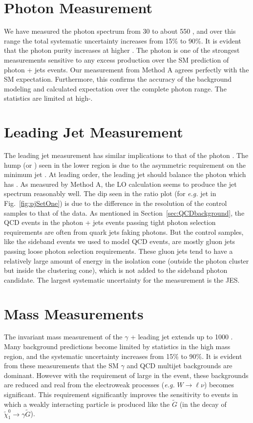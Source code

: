 \section{Photon \et Measurement}
We have measured the photon \et spectrum from 30 \etUnits to about 550 \etUnits, and over this range the total systematic uncertainty increases from 15\% to 90\%. It is evident that the photon purity increases at higher \et. The photon \et is one of the strongest measurements sensitive to any excess production over the SM prediction of photon + jets events. Our measurement from Method A agrees perfectly with the SM expectation. Furthermore, this confirms the accuracy of the background modeling and calculated expectation over the complete photon \et range. The statistics are limited at high-\et.

\section{Leading Jet \et Measurement}
The leading jet \et measurement has similar implications to that of the photon \et. The hump (or ) seen in the lower \et region is due to the asymmetric requirement on the minimum jet \et. At leading order, the leading jet should balance the photon which has . As measured by Method A, the \pythiaText LO calculation seems to produce the jet \et spectrum reasonably well. The dip seen in the ratio plot (for \textit{e.g.} jet \et in Fig.~\ref{fig:pjSetOne}) is due to the difference in the resolution of the control samples to that of the data. As mentioned in Section~\ref{sec:QCDbackground}, the QCD events in the photon + jets events passing tight photon selection requirements are often from quark jets faking photons. But the control samples, like the sideband events we used to model QCD events, are mostly gluon jets passing loose photon selection requirements. These gluon jets tend to have a relatively large amount of energy in the isolation cone (outside the photon cluster but inside the clustering cone), which is not added to the sideband photon candidate. The largest systematic uncertainty for the measurement is the JES.

\section{Mass Measurements}
The invariant mass measurement of the $\gamma$ + leading jet extends up to 1000 \massunits. Many background predictions become limited by statistics in the high mass region, and the systematic uncertainty increases from 15\% to 90\%. It is evident from these measurements that the SM $\gamma$ and QCD multijet backgrounds are dominant. However with the requirement of large \met in the event, these backgrounds are reduced and real \met from the electroweak processes ({\it e.g.} $W \to \ell \nu$) becomes significant. This \met requirement significantly improves the sensitivity to events in which a weakly interacting particle is produced like the $\widetilde{G}$ (in the decay of $\widetilde{\chi}^{0}_{1}\to\gamma\widetilde{G}$).

